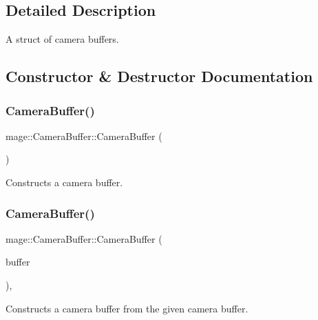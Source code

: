 \subsection{Detailed Description}
A struct of camera buffers. 

\subsection{Constructor \& Destructor Documentation}
\hypertarget{structmage_1_1_camera_buffer_a4f90a7a3c4064fe60f6af1142795afd2}{}\label{structmage_1_1_camera_buffer_a4f90a7a3c4064fe60f6af1142795afd2} 
\subsubsection{\texorpdfstring{Camera\+Buffer()}{CameraBuffer()}\hspace{0.1cm}{\footnotesize\ttfamily [1/3]}}
{\footnotesize\ttfamily mage\+::\+Camera\+Buffer\+::\+Camera\+Buffer (\begin{DoxyParamCaption}{ }\end{DoxyParamCaption})\hspace{0.3cm}{\ttfamily [noexcept]}}

Constructs a camera buffer. \hypertarget{structmage_1_1_camera_buffer_a83b3397d4a064cd6982da5caea2c05e5}{}\label{structmage_1_1_camera_buffer_a83b3397d4a064cd6982da5caea2c05e5} 
\subsubsection{\texorpdfstring{Camera\+Buffer()}{CameraBuffer()}\hspace{0.1cm}{\footnotesize\ttfamily [2/3]}}
{\footnotesize\ttfamily mage\+::\+Camera\+Buffer\+::\+Camera\+Buffer (\begin{DoxyParamCaption}\item[{const \hyperlink{structmage_1_1_camera_buffer}{Camera\+Buffer} \&}]{buffer }\end{DoxyParamCaption})\hspace{0.3cm}{\ttfamily [default]}, {\ttfamily [noexcept]}}

Constructs a camera buffer from the given camera buffer.


